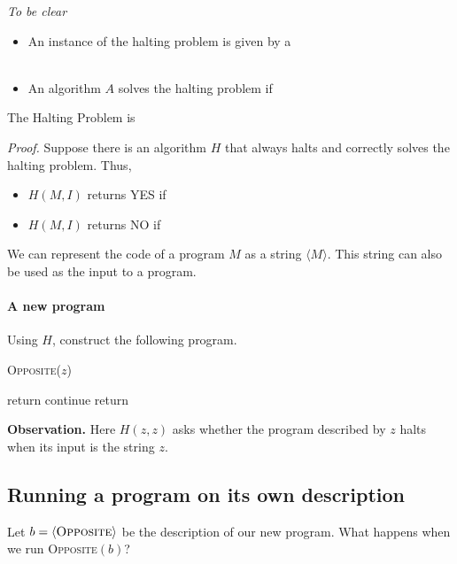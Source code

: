 \documentclass[11  pt]{article}
\begin{document}
\emph{To be clear}
\begin{itemize}
    \item An instance of the halting problem is given by a \\ \\
    \item An algorithm $A$ solves the halting problem if
\end{itemize}

\newpage

\begin{theorem} The Halting Problem is 
\end{theorem}

\textit{Proof.} Suppose there is an algorithm $H$ that always halts and correctly solves the halting problem. Thus,
\begin{itemize}
    \item $H(M,I)$ returns YES if 
    \item $H(M,I)$ returns NO if 
\end{itemize}

We can represent the code of a program $M$ as a string $\langle M\rangle$. This string can also be used as the input to a program.

\paragraph{A new program}
Using $H$, construct the following program.
\begin{algorithm}[h]
    \textsc{Opposite}($z$)
    \begin{algorithmic}
            \State return
        \EndIf
                \State continue
            \EndWhile
        \Else
            \State return
        \EndIf
    \end{algorithmic}
\end{algorithm}

\textbf{Observation.} Here $H(z,z)$ asks whether the program described by $z$ halts when its input is the string $z$.

\newpage
\subsection*{Running a program on its own description}
Let $b=\langle\textsc{Opposite}\rangle$ be the description of our new program. What happens when we run \textsc{Opposite}$(b)$?
\end{document}
